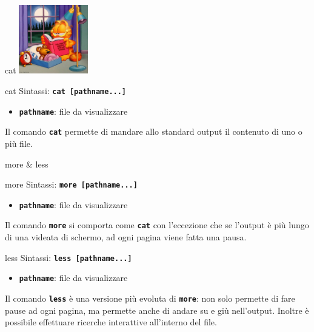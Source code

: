 \documentclass{beamer}
\begin{document}
    \begin{frame}{cat}
        \centering
        \includegraphics[height=3cm, keepaspectratio]{images/garfield.jpg}

        \begin{block}{cat}
            \small
            Sintassi: \texttt{\textbf{cat [pathname...]}}

            \begin{itemize}
                \item \texttt{\textbf{pathname}}: file da visualizzare
            \end{itemize}

            Il comando \texttt{\textbf{cat}} permette di mandare allo standard output il contenuto di uno o più file.
        \end{block}
    \end{frame}

    \begin{frame}{more \& less}
        \small
        \begin{block}{more}
            Sintassi: \texttt{\textbf{more [pathname...]}}

            \begin{itemize}
                \item \texttt{\textbf{pathname}}: file da visualizzare
            \end{itemize}

            Il comando \texttt{\textbf{more}} si comporta come \texttt{\textbf{cat}} con
            l'eccezione che se l'output è più lungo di una videata di schermo, ad ogni pagina viene fatta una pausa.
        \end{block}

        \begin{block}{less}
            Sintassi: \texttt{\textbf{less [pathname...]}}

            \begin{itemize}
                \item \texttt{\textbf{pathname}}: file da visualizzare
            \end{itemize}

            Il comando \texttt{\textbf{less}} è una versione più evoluta di \texttt{\textbf{more}}: non solo permette di
            fare pause ad ogni pagina, ma permette anche di andare su e giù
            nell’output. Inoltre è possibile effettuare ricerche interattive
            all’interno del file.
        \end{block}
    \end{frame}
\end{document}
